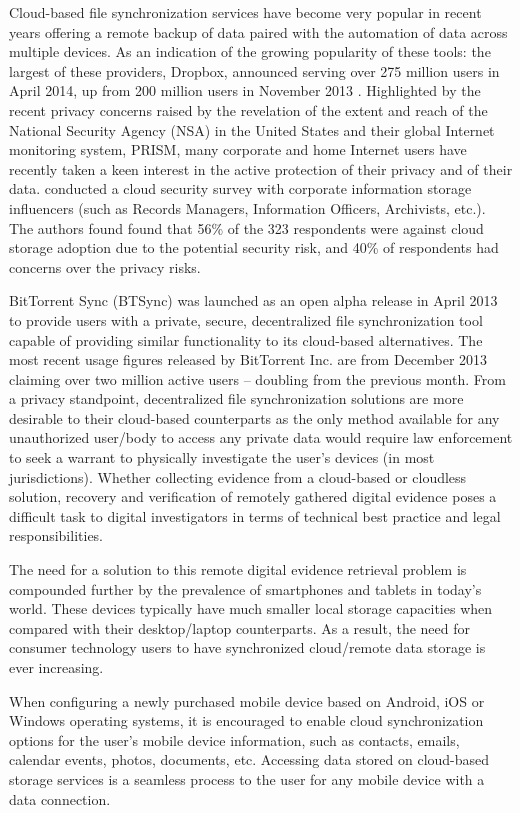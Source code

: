 \documentclass{jdfsl}
\begin{document}
Cloud-based file synchronization services have become very popular in recent years offering a remote backup of data paired with the automation of data across multiple devices. As an indication of the growing popularity of these tools: the largest of these providers, Dropbox, announced serving over 275 million users in April 2014, up from 200 million users in November 2013 \cite{dropbox}. Highlighted by the recent privacy concerns raised by the revelation of the extent and reach of the National Security Agency (NSA) in the United States and their global Internet monitoring system, PRISM, many corporate and home Internet users have recently taken a keen interest in the active protection of their privacy and of their data. \citet{duranti2013records} conducted a cloud security survey with corporate information storage influencers (such as Records Managers, Information Officers, Archivists, etc.). The authors found found that 56\% of the 323 respondents were against cloud storage adoption due to the potential security risk, and 40\% of respondents had concerns over the privacy risks.

BitTorrent Sync (BTSync) was launched as an open alpha release in April 2013 to provide users with a private, secure, decentralized file synchronization tool capable of providing similar functionality to its cloud-based alternatives. The most recent usage figures released by BitTorrent Inc. are from December 2013 claiming over two million active users -- doubling from the previous month. From a privacy standpoint, decentralized file synchronization solutions are more desirable to their cloud-based counterparts as the only method available for any unauthorized user/body to access any private data would require law enforcement to seek a warrant to physically investigate the user's devices (in most jurisdictions). Whether collecting evidence from a cloud-based or cloudless solution, recovery and verification of remotely gathered digital evidence poses a difficult task to digital investigators in terms of technical best practice and legal responsibilities.

The need for a solution to this remote digital evidence retrieval problem is compounded further by the prevalence of smartphones and tablets in today's world. These devices typically have much smaller local storage capacities when compared with their desktop/laptop counterparts. As a result, the need for consumer technology users to have synchronized cloud/remote data storage is ever increasing. 

When configuring a newly purchased mobile device based on Android, iOS or Windows operating systems, it is encouraged to enable cloud synchronization options for the user's mobile device information, such as contacts, emails, calendar events, photos, documents, etc. Accessing data stored on cloud-based storage services is a seamless process to the user for any mobile device with a data connection.
\end{document}
